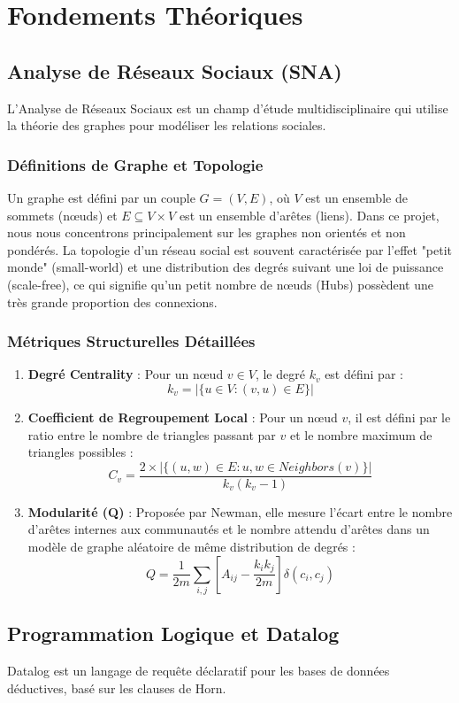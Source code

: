 \documentclass[12pt,a4paper]{report}
\begin{document}
\chapter{Fondements Théoriques}
\section{Analyse de Réseaux Sociaux (SNA)}
L'Analyse de Réseaux Sociaux est un champ d'étude multidisciplinaire qui utilise la théorie des graphes pour modéliser les relations sociales.
\subsection{Définitions de Graphe et Topologie}
Un graphe est défini par un couple $G = (V, E)$, où $V$ est un ensemble de sommets (nœuds) et $E \subseteq V \times V$ est un ensemble d'arêtes (liens). Dans ce projet, nous nous concentrons principalement sur les graphes non orientés et non pondérés.
La topologie d'un réseau social est souvent caractérisée par l'effet "petit monde" (small-world) et une distribution des degrés suivant une loi de puissance (scale-free), ce qui signifie qu'un petit nombre de nœuds (Hubs) possèdent une très grande proportion des connexions.

\subsection{Métriques Structurelles Détaillées}
\begin{enumerate}
    \item \textbf{Degré Centrality} : Pour un nœud $v \in V$, le degré $k_v$ est défini par :
    $$k_v = |\{u \in V : (v, u) \in E\}|$$
    \item \textbf{Coefficient de Regroupement Local} : Pour un nœud $v$, il est défini par le ratio entre le nombre de triangles passant par $v$ et le nombre maximum de triangles possibles :
    $$C_v = \frac{2 \times |\{(u, w) \in E : u, w \in Neighbors(v)\}|}{k_v(k_v - 1)}$$
    \item \textbf{Modularité (Q)} : Proposée par Newman, elle mesure l'écart entre le nombre d'arêtes internes aux communautés et le nombre attendu d'arêtes dans un modèle de graphe aléatoire de même distribution de degrés :
    $$Q = \frac{1}{2m} \sum_{i,j} \left[ A_{ij} - \frac{k_i k_j}{2m} \right] \delta(c_i, c_j)$$
\end{enumerate}

\section{Programmation Logique et Datalog}
Datalog est un langage de requête déclaratif pour les bases de données déductives, basé sur les clauses de Horn.
\end{document}
